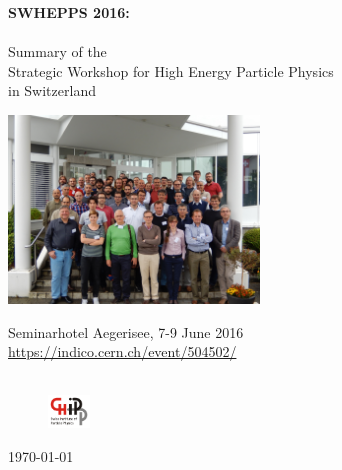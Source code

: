 \documentclass[10pt,a4paper]{article}
\begin{document}
\addtocounter{page}{-1}
\pagestyle{plain}
\begin{center}
{\large {\bf  SWHEPPS 2016:}\\
\ ~\\
Summary of the\\
 Strategic Workshop for High Energy Particle Physics \\
  in Switzerland }\\
\vspace{2cm}

 \includegraphics[width=0.5\textwidth]{figures/GroupPicture.png}
 
\vspace{6cm}

Seminarhotel Aegerisee, 7-9 June 2016 \\
\url{https://indico.cern.ch/event/504502/}  ~\\
\  ~\\


\vspace {-0.5cm}
 \begin{figure}[h]
   \centering
   \includegraphics[width=0.1\textwidth]{figures/CHIPPlogo.png}
 \end{figure}

\vspace{-0.4cm}
\today \\
\end{center}
\newpage 

%



%

\end{document}
